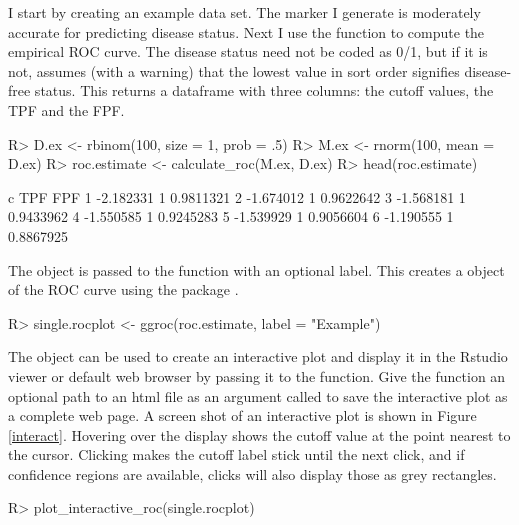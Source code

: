 \documentclass[codesnippet]{jss}
\begin{document}
I start by creating an example data set. The marker I generate is
moderately accurate for predicting disease status. Next I use the
 function to compute the empirical ROC curve. The
disease status need not be coded as 0/1, but if it is not,
 assumes (with a warning) that the lowest value in
sort order signifies disease-free status. This returns a dataframe with
three columns: the cutoff values, the TPF and the FPF.

\begin{Schunk}
\begin{Sinput}
R> D.ex <- rbinom(100, size = 1, prob = .5)
R> M.ex <- rnorm(100, mean = D.ex)
R> roc.estimate <- calculate_roc(M.ex, D.ex)
R> head(roc.estimate)
\end{Sinput}
\begin{Soutput}
          c TPF       FPF
1 -2.182331   1 0.9811321
2 -1.674012   1 0.9622642
3 -1.568181   1 0.9433962
4 -1.550585   1 0.9245283
5 -1.539929   1 0.9056604
6 -1.190555   1 0.8867925
\end{Soutput}
\end{Schunk}

The  object is passed to the  function
with an optional label. This creates a  object of the ROC
curve using the  package \citep{ggplot2}.

\begin{Schunk}
\begin{Sinput}
R> single.rocplot <- ggroc(roc.estimate, label = "Example")
\end{Sinput}
\end{Schunk}

The  object can be used to create an interactive
plot and display it in the Rstudio viewer or default web browser by
passing it to the  function. Give the
function an optional path to an html file as an argument called
 to save the interactive plot as a complete web page. A
screen shot of an interactive plot is shown in Figure \ref{interact}.
Hovering over the display shows the cutoff value at the point nearest to
the cursor. Clicking makes the cutoff label stick until the next click,
and if confidence regions are available, clicks will also display those
as grey rectangles.

\begin{Schunk}
\begin{Sinput}
R> plot_interactive_roc(single.rocplot)
\end{Sinput}
\end{Schunk}
\end{document}
